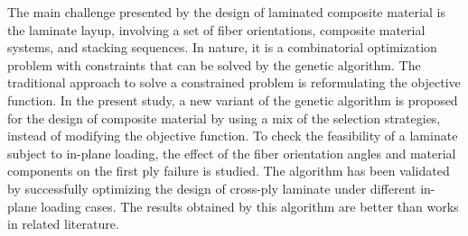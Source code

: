 The main challenge presented by the design of laminated composite material is
the laminate layup, involving a set of fiber orientations, composite material
systems, and stacking sequences. In nature, it is a combinatorial optimization
problem with constraints that can be solved by the genetic algorithm. The
traditional approach to solve a constrained problem is reformulating the
objective function. In the present study, a new variant of the genetic algorithm is
proposed for the design of composite material by using a mix of the selection
strategies, instead of modifying the objective function.  To check the
feasibility of a laminate subject to in-plane loading, the effect of the fiber
orientation angles and material components on the first ply failure is studied.
The algorithm has been validated by successfully optimizing the design of
cross-ply laminate under different in-plane loading cases. The results obtained
by this algorithm are better than works in related literature.
